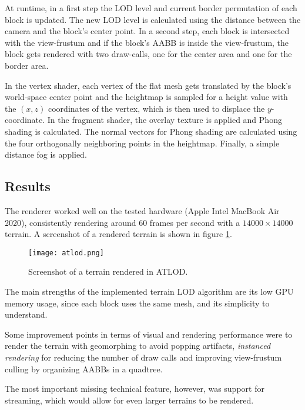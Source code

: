 At runtime, in a first step the LOD level and current border permutation of each block 
is updated. The new LOD level is calculated using the distance between the camera 
and the block's center point.
In a second step, each block is intersected with the view-frustum 
and if the block's AABB is inside the view-frustum, the block gets rendered with two draw-calls,
one for the center area and one for the border area.

In the vertex shader, each vertex of the flat mesh gets translated by the block's world-space center point
and the heightmap is sampled for a height value with the $(x,z)$ coordinates of the vertex, 
which is then used to displace the $y$-coordinate.
In the fragment shader, the overlay texture is applied and Phong shading is calculated.
The normal vectors for Phong shading are calculated using the four orthogonally neighboring points 
in the heightmap. Finally, a simple distance fog is applied.

\subsection{Results}
The renderer worked well on the tested hardware (Apple Intel MacBook Air 2020), 
consistently rendering around 60 frames per second with a 
$14000 \times 14000$ terrain. A screenshot of a rendered terrain 
is shown in figure \ref{fig:atlod}.

\begin{figure}[H]
  \centering
  \texttt{[image: atlod.png]}
  \caption{Screenshot of a terrain rendered in ATLOD.}\label{fig:atlod}
\end{figure}

The main strengths of the implemented terrain LOD algorithm are
its low GPU memory usage, since each block uses the same mesh,
and its simplicity to understand.

Some improvement points in terms of visual and rendering performance 
were to render the terrain with geomorphing to avoid popping artifacts, \textit{instanced rendering} for
reducing the number of draw calls and improving 
view-frustum culling by organizing AABBs in a quadtree.

The most important missing technical feature, however, was support for 
streaming, which would allow for even larger terrains 
to be rendered. 